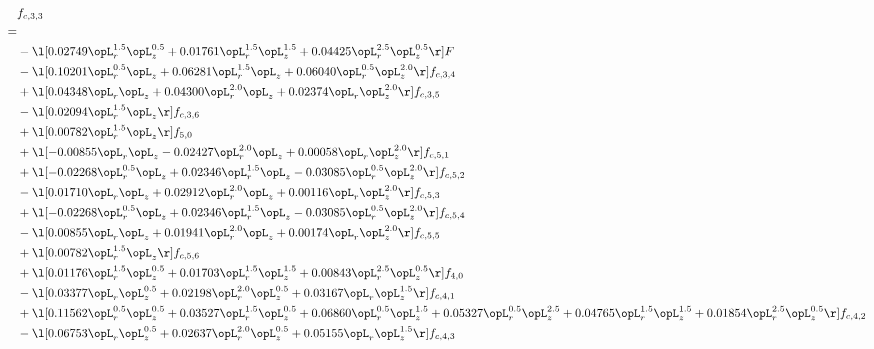 \begin{alignat}{2} 
\label{eq:f_33_2} 
& f_{c,3,3} \nonumber \\ 
 = \\ 
& - \l[  0.02749 \opL_r^{1.5} \opL_z^{0.5} +  0.01761 \opL_r^{1.5} \opL_z^{1.5} +  0.04425 \opL_r^{2.5} \opL_z^{0.5}  \r] F \nonumber \\ 
& - \l[  0.10201 \opL_r^{0.5} \opL_z +  0.06281 \opL_r^{1.5} \opL_z +  0.06040 \opL_r^{0.5} \opL_z^{2.0}  \r] f_{c,3,4} \nonumber \\ 
& + \l[  0.04348 \opL_r \opL_z +  0.04300 \opL_r^{2.0} \opL_z +  0.02374 \opL_r \opL_z^{2.0}  \r] f_{c,3,5} \nonumber \\ 
& - \l[  0.02094 \opL_r^{1.5} \opL_z  \r] f_{c,3,6} \nonumber \\ 
& + \l[  0.00782 \opL_r^{1.5} \opL_z  \r] f_{5,0} \nonumber \\ 
& + \l[  -0.00855 \opL_r \opL_z   -0.02427 \opL_r^{2.0} \opL_z +  0.00058 \opL_r \opL_z^{2.0}  \r] f_{c,5,1} \nonumber \\ 
& + \l[  -0.02268 \opL_r^{0.5} \opL_z +  0.02346 \opL_r^{1.5} \opL_z   -0.03085 \opL_r^{0.5} \opL_z^{2.0}  \r] f_{c,5,2} \nonumber \\ 
& - \l[  0.01710 \opL_r \opL_z +  0.02912 \opL_r^{2.0} \opL_z +  0.00116 \opL_r \opL_z^{2.0}  \r] f_{c,5,3} \nonumber \\ 
& + \l[  -0.02268 \opL_r^{0.5} \opL_z +  0.02346 \opL_r^{1.5} \opL_z   -0.03085 \opL_r^{0.5} \opL_z^{2.0}  \r] f_{c,5,4} \nonumber \\ 
& - \l[  0.00855 \opL_r \opL_z +  0.01941 \opL_r^{2.0} \opL_z +  0.00174 \opL_r \opL_z^{2.0}  \r] f_{c,5,5} \nonumber \\ 
& + \l[  0.00782 \opL_r^{1.5} \opL_z  \r] f_{c,5,6} \nonumber \\ 
& + \l[  0.01176 \opL_r^{1.5} \opL_z^{0.5} +  0.01703 \opL_r^{1.5} \opL_z^{1.5} +  0.00843 \opL_r^{2.5} \opL_z^{0.5}  \r] f_{4,0} \nonumber \\ 
& - \l[  0.03377 \opL_r \opL_z^{0.5} +  0.02198 \opL_r^{2.0} \opL_z^{0.5} +  0.03167 \opL_r \opL_z^{1.5}  \r] f_{c,4,1} \nonumber \\ 
& + \l[  0.11562 \opL_r^{0.5} \opL_z^{0.5} +  0.03527 \opL_r^{1.5} \opL_z^{0.5} +  0.06860 \opL_r^{0.5} \opL_z^{1.5} +  0.05327 \opL_r^{0.5} \opL_z^{2.5} +  0.04765 \opL_r^{1.5} \opL_z^{1.5} +  0.01854 \opL_r^{2.5} \opL_z^{0.5}  \r] f_{c,4,2} \nonumber \\ 
& - \l[  0.06753 \opL_r \opL_z^{0.5} +  0.02637 \opL_r^{2.0} \opL_z^{0.5} +  0.05155 \opL_r \opL_z^{1.5}  \r] f_{c,4,3} \nonumber \\ 

\end{alignat}
